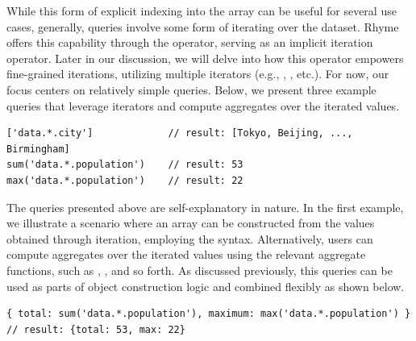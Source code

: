 \documentclass[runningheads]{llncs}
\newcommand{\lang}{Rhyme}
\begin{document}
While this form of explicit indexing into the array can be useful for several
use cases, generally, queries involve some form of iterating over the dataset.
\lang{} offers this capability through the \inline{*} operator,
serving as an implicit iteration operator.
Later in our discussion, we will delve into how this operator empowers fine-grained
iterations, utilizing multiple iterators
(e.g., , , etc.).
For now, our focus centers on relatively simple queries.
Below, we present three example queries that leverage iterators and compute
aggregates over the iterated values.

\begin{lstlisting}[style=JavaScript, columns=flexible]
['data.*.city']             // result: [Tokyo, Beijing, ..., Birmingham]
sum('data.*.population')    // result: 53
max('data.*.population')    // result: 22
\end{lstlisting}

The queries presented above are self-explanatory in nature.
In the first example, we illustrate a scenario where an array can be constructed
from the values obtained through iteration, employing the \inline{[...]} syntax.
Alternatively, users can compute aggregates over the iterated values using the
relevant aggregate functions, such as , , and so forth.
As discussed previously, this queries can be used as parts of object
construction logic and combined flexibly as shown below.

\begin{lstlisting}[style=JavaScript, columns=flexible, numbers=none]
{ total: sum('data.*.population'), maximum: max('data.*.population') }
// result: {total: 53, max: 22}
\end{lstlisting}


\end{document}
